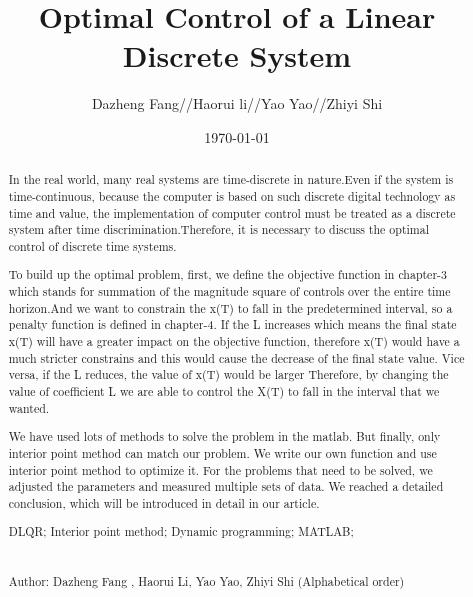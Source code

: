 \documentclass{mcmthesis}
\title{\large Optimal Control of a Linear Discrete System}
\author{Dazheng Fang//Haorui li//Yao Yao//Zhiyi Shi }
\date{\today}
\begin{document}
\begin{abstract}

In the real world, many real systems are time-discrete in nature.Even if the system is time-continuous, because the computer is based on such discrete digital technology as time and value, the implementation of computer control must be treated as a discrete system after time discrimination.Therefore, it is necessary to discuss the optimal control of discrete time systems.

To build up the optimal problem, first, we define the objective function in chapter-3 which stands for summation of the magnitude square of controls over the entire time horizon.And we want to constrain the x(T) to fall in the predetermined interval, so a penalty function is defined in chapter-4. If the L increases which means the final state x(T) will have a greater impact on the objective function, therefore x(T) would have a much stricter constrains and this would cause the decrease of the final state value. Vice versa, if the L reduces, the value of x(T) would be larger
Therefore, by changing the value of coefficient L we are able to control the X(T) to fall in the interval that we wanted.

We have used lots of methods to solve the problem in the matlab. But finally, only interior point method can match our problem. We write our own function and use interior point method to optimize it. For the problems that need to be solved, we adjusted the parameters and measured multiple sets of data. We reached a detailed conclusion, which will be introduced in detail in our article.



\begin{keywords}
DLQR; Interior point method;  Dynamic programming; MATLAB; \\\\\\
Author: Dazheng Fang , Haorui Li, Yao Yao, Zhiyi Shi (Alphabetical order)
\end{keywords}


\end{abstract}
\maketitle
\newpage                                                          %
\begin{adjustwidth}{-1cm}{0cm}

\setcounter{tocdepth}{3}
\thispagestyle{empty}
\tableofcontents                                                  %

\end{adjustwidth}
\end{document}
